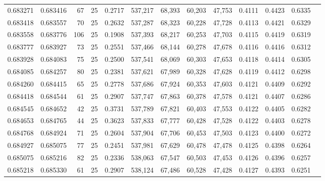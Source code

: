\begin{tabular}{rrrrrrrrrrrrr}
0.683271 & 0.683416 &    67 &  25 &                                     0.2717 & 537,217 &  68,393 &  60,203 &  47,753 & 0.4111 & 0.4423 & 0.6335 \\
0.683418 & 0.683557 &    70 &  25 &                                     0.2632 & 537,287 &  68,323 &  60,228 &  47,728 & 0.4113 & 0.4421 & 0.6329 \\
0.683558 & 0.683776 &   106 &  25 &                                     0.1908 & 537,393 &  68,217 &  60,253 &  47,703 & 0.4115 & 0.4419 & 0.6319 \\
0.683777 & 0.683927 &    73 &  25 &                                     0.2551 & 537,466 &  68,144 &  60,278 &  47,678 & 0.4116 & 0.4416 & 0.6312 \\
0.683928 & 0.684083 &    75 &  25 &                                     0.2500 & 537,541 &  68,069 &  60,303 &  47,653 & 0.4118 & 0.4414 & 0.6305 \\
0.684085 & 0.684257 &    80 &  25 &                                     0.2381 & 537,621 &  67,989 &  60,328 &  47,628 & 0.4119 & 0.4412 & 0.6298 \\
0.684260 & 0.684415 &    65 &  25 &                                     0.2778 & 537,686 &  67,924 &  60,353 &  47,603 & 0.4121 & 0.4409 & 0.6292 \\
0.684418 & 0.684544 &    61 &  25 &                                     0.2907 & 537,747 &  67,863 &  60,378 &  47,578 & 0.4121 & 0.4407 & 0.6286 \\
0.684545 & 0.684652 &    42 &  25 &                                     0.3731 & 537,789 &  67,821 &  60,403 &  47,553 & 0.4122 & 0.4405 & 0.6282 \\
0.684653 & 0.684765 &    44 &  25 &                                     0.3623 & 537,833 &  67,777 &  60,428 &  47,528 & 0.4122 & 0.4403 & 0.6278 \\
0.684768 & 0.684924 &    71 &  25 &                                     0.2604 & 537,904 &  67,706 &  60,453 &  47,503 & 0.4123 & 0.4400 & 0.6272 \\
0.684927 & 0.685075 &    77 &  25 &                                     0.2451 & 537,981 &  67,629 &  60,478 &  47,478 & 0.4125 & 0.4398 & 0.6264 \\
0.685075 & 0.685216 &    82 &  25 &                                     0.2336 & 538,063 &  67,547 &  60,503 &  47,453 & 0.4126 & 0.4396 & 0.6257 \\
0.685218 & 0.685330 &    61 &  25 &                                     0.2907 & 538,124 &  67,486 &  60,528 &  47,428 & 0.4127 & 0.4393 & 0.6251 \\

\end{tabular}
